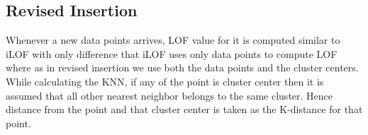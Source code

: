 \subsection{Revised Insertion}
Whenever a new data points arrives, LOF value for it is computed similar to iLOF with only difference that iLOF uses only data points to compute LOF where as in revised insertion we use both the data points and the cluster centers. While calculating the KNN, if any of the point is cluster center then it is assumed that all other nearest neighbor belongs to the same cluster. Hence distance from the point and that cluster center is taken as the K-distance for that point.  

